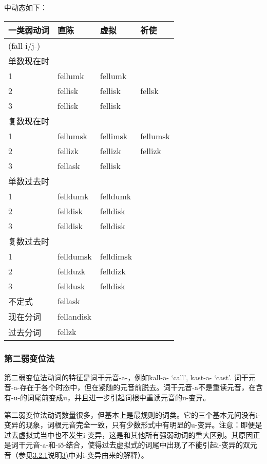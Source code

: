 中动态如下：

\begin{longtable}{llll}
\toprule
一类弱动词 & 直陈 & 虚拟 & 祈使 \\
\midrule
\endhead
\bottomrule
\endfoot
(fall-i/j-) & & & \\
单数现在时 & & & \\
1 & fellumk & fellumk & \\
2 & fellisk & fellisk & fellsk \\
3 & fellisk & fellisk & \\
复数现在时 & & & \\
1 & fellumsk & fellimsk & fellumsk \\
2 & fellizk & fellizk & fellizk \\
3 & fellask & fellisk & \\
单数过去时 & & & \\
1 & felldumk & felldumk & \\
2 & felldisk & felldisk & \\
3 & felldisk & felldisk & \\
复数过去时 & & & \\
1 & felldumsk & felldimsk & \\
2 & fellduzk & felldizk & \\
3 & felldusk & felldisk & \\
不定式 & fellask & & \\
现在分词 & fellandisk & & \\
过去分词 & fellzk & & \\
\end{longtable}

\subsubsection{第二弱变位法}\label{ux7b2cux4e8cux5f31ux53d8ux4f4dux6cd5}

第二弱变位法动词的特征是词干元音-a-，例如kall-a- `call‌', kast-a- `cast‌'.
词干元音-a-存在于各个时态中，但在紧随的元音前脱去。词干元音-a不是重读元音，在含有-u-的词尾前变成u，并且进一步引起词根中重读元音的u-变异。

第二弱变位法动词数量很多，但基本上是最规则的词类。它的三个基本元间没有i-变异的现象，词根元音完全一致，只有少数形式中有明显的u-变异。注意：即便是过去虚拟式当中也不发生i-变异，这是和其他所有强弱动词的重大区别。其原因正是词干元音-a-和-ið-结合，使得过去虚拟式的词尾中出现了不能引起i-变异的双元音（参见\hyperref[ux5f3aux52a8ux8bcdux7684ux4e3bux52a8ux8bcdux5c3e]{3.2.1}说明\hyperref[_Ref116919964]{3)}中对i-变异由来的解释）。

